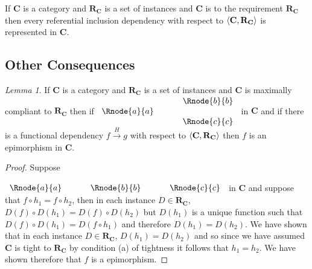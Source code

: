 \documentclass[10pt,a4paper]{article}
\theoremstyle{remark}
\newtheorem*{lemma*}{Lemma}
\newcommand{\catc}[1][C]{\textbf{#1}}
\newcommand{\reqt}{\textbf{R}}
\newcommand{\reqtc}[1][\catc]{\reqt_{#1}}
\newcommand{\fundep}[3]{#2 \xrightarrow{#1} #3}
\begin{document}
\begin{lemma}
\label{catincdsrepresented}
If $\catc$ is a category and $\reqtc$ is a set of instances  and $\catc$ is 
 to the requirement $\reqtc$ then
every referential inclusion dependency with respect to $\tuple{\catc,\reqtc}$ is represented in $\catc$.
\end{lemma}

\subsection{Other Consequences}

\begin{lemma*}
If $\catc$ is a category and $\reqtc$ is a set of instances and $\catc$ is maximally compliant to $\reqtc$
then if
$
\begin{array}{c p{0.5cm} c  }
             &&   \Rnode{b}{b} \\[0.01cm]
\Rnode{a}{a} &&                \\[0.01cm] 
             &&   \Rnode{c}{c}         
\end{array} 
$
in $\catc$ and if there is a functional dependency $\fundep{H}{f}{g}$ with respect to $\tuple{\catc,\reqtc}$ then 
$f$ is an epimorphism in $\catc$.
\end{lemma*}
\begin{proof}
Suppose 
\rule[-0.5cm]{0pt}{0.5cm} %
$
\begin{array}{c p{0.5cm} c p{0.5cm} c}
\Rnode{a}{a} &&   \Rnode{b}{b} &&   \Rnode{c}{c} 
\end{array} 
$
in $\catc$ and suppose that $f \circ h_1=f \circ h_2$, then in each instance 
 $D \in \reqtc$, $D(f) \circ D(h_1) = D(f) \circ D(h_2)$ but $D(h_1)$ is a unique function such that
$D(f) \circ D(h_1) = D(f \circ h_1)$ and therefore $D(h_1)=D(h_2)$. We have shown that in each instance $D \in \reqtc$, 
$D(h_1)=D(h_2)$ and so since we have assumed $\catc$ is tight to $\reqtc$  by condition (a) of tightness it
follows that $h_1=h_2$. We have shown therefore that $f$ is a epimorphism.
\end{proof}
\end{document}
